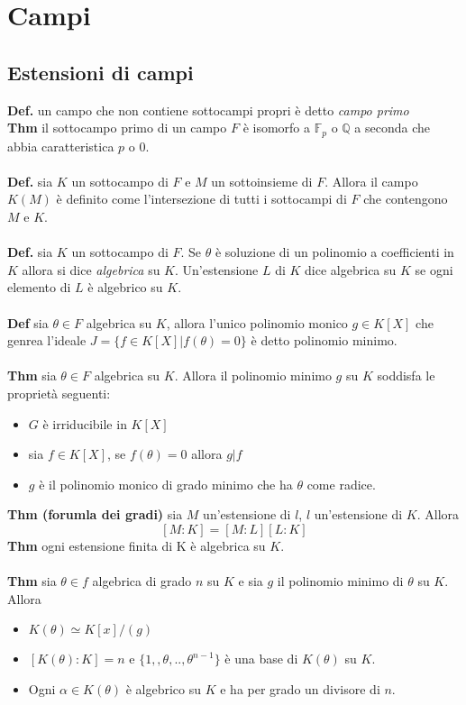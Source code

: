 \documentclass[10pt,a4paper]{article}
\begin{document}
\section{Campi}
\subsection{Estensioni di campi}
\textbf{Def.} un campo che non contiene sottocampi propri è detto \emph{campo primo}\\
\textbf{Thm} il sottocampo primo di un campo $F$ è isomorfo a $\mathbb{F}_p$ o $\mathbb{Q}$ a seconda che abbia caratteristica $p$ o 0.\\\\
\textbf{Def.} sia $K$ un sottocampo di $F$ e $M$ un sottoinsieme di $F$. Allora il campo $K(M)$ è definito come l'intersezione di tutti i sottocampi di $F$ che contengono $M$ e $K$.\\\\
\textbf{Def.} sia $K$ un sottocampo di $F$. Se $\theta$ è soluzione di un polinomio a coefficienti in $K$ allora si dice \emph{algebrica} su $K$. Un'estensione $L$ di $K$ dice algebrica su $K$ se ogni elemento di $L$ è algebrico su $K$.\\\\
\textbf{Def} sia $\theta \in F$ algebrica su $K$, allora l'unico polinomio monico $g\in K[X]$ che genrea l'ideale $J = \{f \in K[X] | f(\theta) = 0\}$ è detto polinomio minimo.\\\\
\textbf{Thm} sia $\theta \in F$ algebrica su $K$. Allora il polinomio minimo $g$ su $K$ soddisfa le proprietà seguenti:
\begin{itemize}
\item $G$ è irriducibile in $K[X]$
\item sia $f \in K[X]$, se $f(\theta)=0$ allora $g|f$
\item $g$ è il polinomio monico di grado minimo che ha $\theta$ come radice.
\end{itemize}
\textbf{Thm (forumla dei gradi)} sia $M$ un'estensione di $l$, $l$ un'estensione di $K$. Allora 
$$ [M:K] = [M:L][L:K]$$
\textbf{Thm} ogni estensione finita di K è algebrica su $K$.\\\\
\textbf{Thm} sia $\theta \in f$ algebrica di grado $n$ su $K$ e sia $g$ il polinomio minimo di $\theta$ su $K$. Allora
\begin{itemize}
\item $K(\theta) \simeq K[x]/(g)$
\item $[K(\theta):K]=n$ e $\{1,,\theta,..,\theta^{n-1}\}$ è una base di $K(\theta)$ su $K$.
\item Ogni $\alpha \in K(\theta)$ è algebrico su $K$ e ha per grado un divisore di $n$.
\end{itemize}
\end{document}
